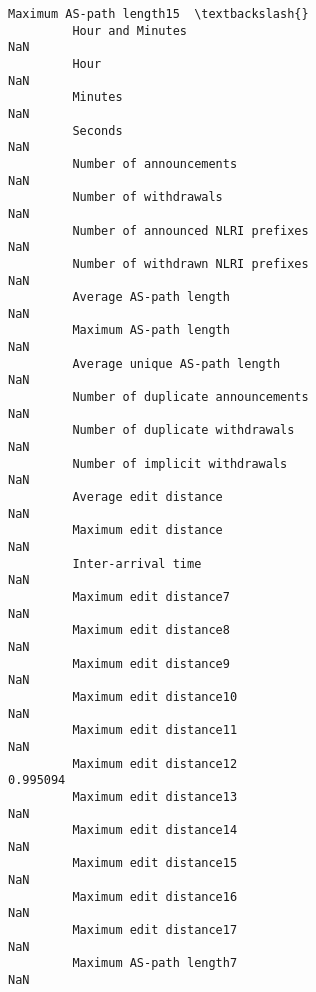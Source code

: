 \documentclass[11pt]{article}
\begin{document}
\begin{Verbatim}[commandchars=\\\{\}]
                                                            Maximum AS-path length15  \textbackslash{}
         Hour and Minutes                                                        NaN   
         Hour                                                                    NaN   
         Minutes                                                                 NaN   
         Seconds                                                                 NaN   
         Number of announcements                                                 NaN   
         Number of withdrawals                                                   NaN   
         Number of announced NLRI prefixes                                       NaN   
         Number of withdrawn NLRI prefixes                                       NaN   
         Average AS-path length                                                  NaN   
         Maximum AS-path length                                                  NaN   
         Average unique AS-path length                                           NaN   
         Number of duplicate announcements                                       NaN   
         Number of duplicate withdrawals                                         NaN   
         Number of implicit withdrawals                                          NaN   
         Average edit distance                                                   NaN   
         Maximum edit distance                                                   NaN   
         Inter-arrival time                                                      NaN   
         Maximum edit distance7                                                  NaN   
         Maximum edit distance8                                                  NaN   
         Maximum edit distance9                                                  NaN   
         Maximum edit distance10                                                 NaN   
         Maximum edit distance11                                                 NaN   
         Maximum edit distance12                                            0.995094   
         Maximum edit distance13                                                 NaN   
         Maximum edit distance14                                                 NaN   
         Maximum edit distance15                                                 NaN   
         Maximum edit distance16                                                 NaN   
         Maximum edit distance17                                                 NaN   
         Maximum AS-path length7                                                 NaN   

\end{Verbatim}
\end{document}
